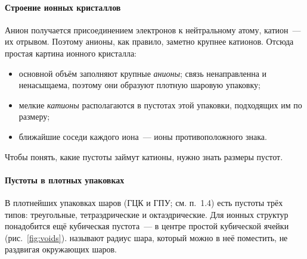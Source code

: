 \paragraph{Строение ионных кристаллов}
Анион получается присоединением электронов к нейтральному атому, катион~—
их отрывом. Поэтому анионы, как правило, заметно крупнее катионов. Отсюда
простая картина ионного кристалла:
\begin{itemize}
\item основной объём заполняют крупные \emph{анионы}; связь ненаправленна
и ненасыщаема, поэтому они образуют плотную шаровую упаковку;
\item мелкие \emph{катионы} располагаются в пустотах этой упаковки,
подходящих им по размеру;
\item ближайшие соседи каждого иона~— ионы противоположного знака.
\end{itemize}
Чтобы понять, какие пустоты займут катионы, нужно знать размеры пустот.

\paragraph{Пустоты в плотных упаковках}
В плотнейших упаковках шаров (ГЦК и ГПУ; см. п.~1.4) есть пустоты трёх
типов: треугольные, тетраэдрические и октаэдрические. Для ионных структур
понадобится ещё кубическая пустота~— в центре простой кубической ячейки
(рис.~\ref{fig:voids}).  называют радиус шара,
который можно в неё поместить, не раздвигая окружающих шаров.

